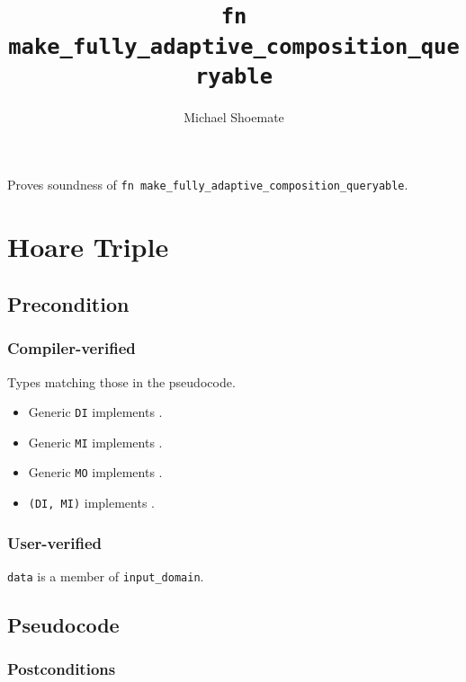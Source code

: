 \documentclass{article}
\title{\texttt{fn make\_fully\_adaptive\_composition\_queryable}}
\author{Michael Shoemate}
\date{}
\begin{document}
\maketitle

\contrib
Proves soundness of \texttt{fn make\_fully\_adaptive\_composition\_queryable}.

\section{Hoare Triple}
\subsection*{Precondition}
\subsubsection*{Compiler-verified}
Types matching those in the pseudocode.

\begin{itemize}
    \item Generic \texttt{DI} implements .
    \item Generic \texttt{MI} implements .
    \item Generic \texttt{MO} implements .
    \item \texttt{(DI, MI)} implements .
\end{itemize}

\subsubsection*{User-verified}
\texttt{data} is a member of \texttt{input\_domain}.


\subsection*{Pseudocode}


\subsubsection*{Postconditions}
\begin{theorem}
\end{theorem}
\end{document}

